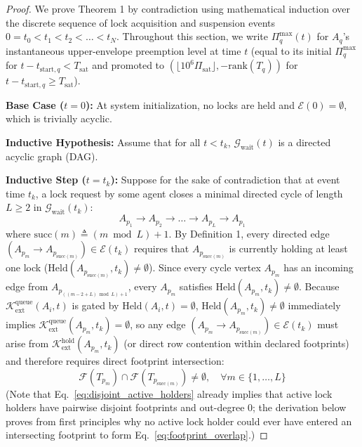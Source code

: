 \documentclass[conference,10pt]{IEEEtran}
\begin{document}
\begin{proof}
We prove Theorem 1 by contradiction using mathematical induction over the discrete sequence of lock acquisition and suspension events $0 = t_0 < t_1 < t_2 < \dots < t_N$. Throughout this section, we write $\Pi_q^{\max}(t)$ for $A_q$'s instantaneous upper-envelope preemption level at time $t$ (equal to its initial $\Pi_q^{\max}$ for $t - t_{\text{start},q} < T_{\text{sat}}$ and promoted to $(\lfloor 10^6 \Pi_{\text{sat}} \rfloor, -\text{rank}(T_q))$ for $t - t_{\text{start},q} \ge T_{\text{sat}}$).

\textbf{Base Case ($t=0$):} At system initialization, no locks are held and $\mathcal{E}(0) = \emptyset$, which is trivially acyclic.

\textbf{Inductive Hypothesis:} Assume that for all $t < t_k$, $\mathcal{G}_{\text{wait}}(t)$ is a directed acyclic graph (DAG).

\textbf{Inductive Step ($t = t_k$):} Suppose for the sake of contradiction that at event time $t_k$, a lock request by some agent closes a minimal directed cycle of length $L \ge 2$ in $\mathcal{G}_{\text{wait}}(t_k)$:
\begin{equation}
A_{p_1} \to A_{p_2} \to \dots \to A_{p_L} \to A_{p_1}
\end{equation}
where $\text{succ}(m) \triangleq (m \bmod L) + 1$. By Definition 1, every directed edge $(A_{p_m} \to A_{p_{\text{succ}(m)}}) \in \mathcal{E}(t_k)$ requires that $A_{p_{\text{succ}(m)}}$ is currently holding at least one lock ($\text{Held}(A_{p_{\text{succ}(m)}}, t_k) \ne \emptyset$). Since every cycle vertex $A_{p_m}$ has an incoming edge from $A_{p_{((m-2+L) \bmod L)+1}}$, every $A_{p_m}$ satisfies $\text{Held}(A_{p_m}, t_k) \ne \emptyset$. Because $\mathcal{K}_{\text{ext}}^{\text{queue}}(A_i, t)$ is gated by $\text{Held}(A_i, t) = \emptyset$, $\text{Held}(A_{p_m}, t_k) \ne \emptyset$ immediately implies $\mathcal{K}_{\text{ext}}^{\text{queue}}(A_{p_m}, t_k) = \emptyset$, so any edge $(A_{p_m} \to A_{p_{\text{succ}(m)}}) \in \mathcal{E}(t_k)$ must arise from $\mathcal{K}_{\text{ext}}^{\text{hold}}(A_{p_m}, t_k)$ (or direct row contention within declared footprints) and therefore requires direct footprint intersection:
\begin{equation}
\label{eq:footprint_overlap}
\mathcal{F}(T_{p_m}) \cap \mathcal{F}(T_{p_{\text{succ}(m)}}) \ne \emptyset, \quad \forall m \in \{1, \dots, L\}
\end{equation}
(Note that Eq.~\eqref{eq:disjoint_active_holders} already implies that active lock holders have pairwise disjoint footprints and out-degree $0$; the derivation below proves from first principles why no active lock holder could ever have entered an intersecting footprint to form Eq.~\eqref{eq:footprint_overlap}.)


\end{proof}
\end{document}

